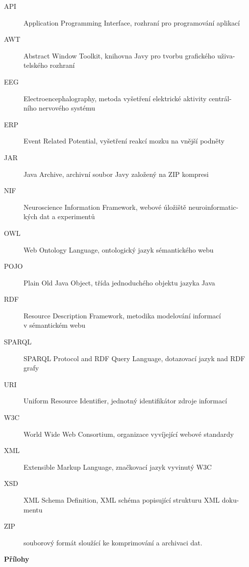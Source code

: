 \documentclass{projekt}
\begin{document}
\noindent
\begin{description}
\item[API] Application Programming Interface, rozhraní pro programování aplikací
\item[AWT] Abstract Window Toolkit, knihovna Javy pro tvorbu grafického uživa-\\telského rozhraní
\item[EEG] Electroencephalography, metoda vyšetření elektrické aktivity centrál-\\ního nervového
systému
\item[ERP] Event Related Potential, vyšetření reakcí mozku na vnější podněty
\item[JAR] Java Archive, archivní soubor Javy založený na ZIP kompresi
\item[NIF] Neuroscience Information Framework, webové úložiště neuroinformatic-\\kých dat a experimentů
\item[OWL] Web Ontology Language, ontologický jazyk sémantického webu
\item[POJO] Plain Old Java Object, třída jednoduchého objektu jazyka Java
\item[RDF] Resource Description Framework, metodika modelování informací \\v sémantickém webu
\item[SPARQL] SPARQL Protocol and RDF Query Language, dotazovací jazyk nad RDF grafy
\item[URI] Uniform Resource Identifier, jednotný identifikátor zdroje informací
\item[W3C] World Wide Web Consortium, organizace vyvíjející webové standardy
\item[XML] Extensible Markup Language, značkovací jazyk vyvinutý W3C
\item[XSD] XML Schema Definition, XML schéma popisující strukturu XML doku-\\mentu
\item[ZIP] souborový formát sloužící ke komprimování a archivaci dat.
\end{description}



%
%




\appendix
\newpage

\thispagestyle{plain}

\noindent
{\bf \LARGE Přílohy}
\setcounter{chapter}{1}
\end{document}
